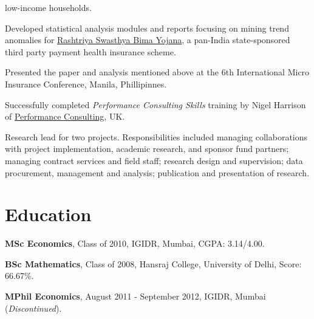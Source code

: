 \documentclass[a4paper,10pt]{article}
\renewenvironment{itemize}{
\begin{list}{}{
  \setlength{\leftmargin}{1.5em}
  }
  }{
\end{list}
}
\begin{document}
{\begin{itemize}
\begin{itemize}
        low-income households.
      \item Developed statistical analysis modules and reports focusing on
        mining trend anomalies for
        \href{http://www.rsby.gov.in/}{Rashtriya Swasthya Bima Yojana},
        a pan-India state-sponsored third party payment health
        insurance scheme.
      \item Presented the paper and analysis mentioned above at the 6th
        International Micro Insurance Conference, Manila, Phillipinnes.
      \item Successfully completed \emph{Performance Consulting Skills}
        training by Nigel Harrison of
        \href{http://performconsult.co.uk/}{Performance Consulting}, UK.
      \item Research lead for two projects. Responsibilities included managing
        collaborations with project implementation, academic research, and
        sponsor fund partners; managing contract services and field staff;
        research design and supervision; data procurement, management and
        analysis; publication and presentation of research.
    \end{itemize}
\end{itemize}}

\section*{Education}
\begin{itemize}
  \item \textbf{MSc Economics}, Class of 2010, IGIDR, Mumbai, CGPA: 3.14/4.00.
  \item \textbf{BSc Mathematics}, Class of 2008, Hansraj College, University of
    Delhi, Score: 66.67\%.
  \item \textbf{MPhil Economics}, August 2011 - September 2012, IGIDR, Mumbai
    (\emph{Discontinued}).
\end{itemize}
\end{document}
